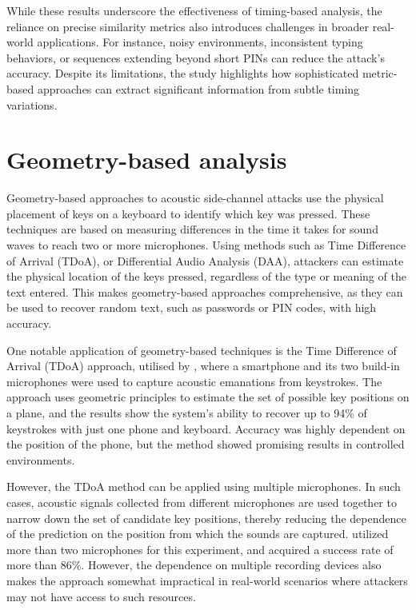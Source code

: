 \documentclass[a4paper,11pt,twoside]{report}
\theoremstyle{definition}
\begin{document}
While these results underscore the effectiveness of timing-based analysis, the reliance on precise similarity metrics also introduces challenges in broader real-world applications. For instance, noisy environments, inconsistent typing behaviors, or sequences extending beyond short PINs can reduce the attack's accuracy. Despite its limitations, the study highlights how sophisticated metric-based approaches can extract significant information from subtle timing variations.

\section{Geometry-based analysis}

Geometry-based approaches to acoustic side-channel attacks use the physical placement of keys on a keyboard to identify which key was pressed. These techniques are based on measuring differences in the time it takes for sound waves to reach two or more microphones. Using methods such as Time Difference of Arrival (TDoA), or Differential Audio Analysis (DAA), attackers can estimate the physical location of the keys pressed, regardless of the type or meaning of the text entered. This makes geometry-based approaches comprehensive, as they can be used to recover random text, such as passwords or PIN codes, with high accuracy.

One notable application of geometry-based techniques is the Time Difference of Arrival (TDoA) approach, utilised by \textit{\cite{tdoa}}, where a smartphone and its two build-in microphones were used to capture acoustic emanations from keystrokes.
The approach uses geometric principles to estimate the set of possible key positions on a plane, and the results show the system's ability to recover up to 94\% of keystrokes with just one phone and keyboard. Accuracy was highly dependent on the position of the phone, but the method showed promising results in controlled environments.

However, the TDoA method can be applied using multiple microphones. In such cases, acoustic signals collected from different microphones are used together to narrow down the set of candidate key positions, thereby reducing the dependence of the prediction on the position from which the sounds are captured. \textit{\cite{tdoa2}} utilized more than two microphones for this experiment, and acquired a success rate of more than 86\%. However, the dependence on multiple recording devices also makes the approach somewhat impractical in real-world scenarios where attackers may not have access to such resources.
\end{document}
